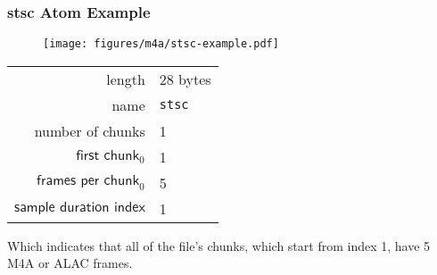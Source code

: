 \subsubsection{stsc Atom Example}
\begin{figure}[h]
  \texttt{[image: figures/m4a/stsc-example.pdf]}
\end{figure}
\par
\noindent
\begin{tabular}{rl}
  \textsf{length} & 28 bytes \\
  \textsf{name} & \texttt{stsc} \\
  \textsf{number of chunks} & 1 \\
  $\textsf{first chunk}_0$ & 1 \\
  $\textsf{frames per chunk}_0$ & 5 \\
  $\textsf{sample duration index}$ & 1 \\
\end{tabular}
\par
\noindent
Which indicates that all of the file's chunks, which start from index 1,
have 5 M4A or ALAC frames.

\clearpage

